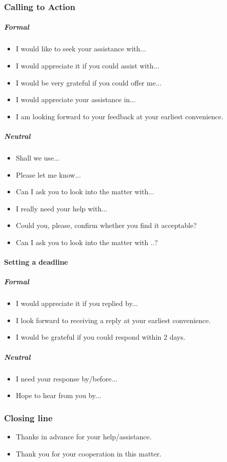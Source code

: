 \subsubsection{Calling to Action}
\subparagraph{Formal}
\begin{itemize}
\item I would like to seek your assistance with...
\item I would appreciate it if you could assist with...
\item I would be very grateful if you could offer me...
\item I would appreciate your assistance in...
\item I am looking forward to your feedback at your earliest convenience.
\end{itemize}

\subparagraph{Neutral}
\begin{itemize}
\item Shall we use...
\item Please let me know...
\item Can I ask you to look into the matter with...
\item I really need your help with...
\item Could you, please, confirm whether you find it acceptable?
\item Can I ask you to look into the matter with ..?
\end{itemize}

\paragraph{Setting a deadline}

\subparagraph{Formal}
\begin{itemize}
\item I would appreciate it if you replied by...
\item I look forward to receiving a reply at your earliest convenience.
\item I would be grateful if you could respond within 2 days.
\end{itemize}

\subparagraph{Neutral}
\begin{itemize}
\item I need your response by/before...
\item Hope to hear from you by...
\end{itemize}
\subsubsection{Closing line}
\begin{itemize}
\item Thanks in advance for your help/assistance.
\item Thank you for your cooperation in this matter.
\end{itemize}
